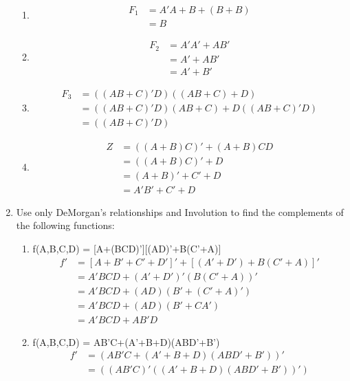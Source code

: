 \documentclass[12pt]{article}
\begin{document}
\begin{enumerate}
    \begin{enumerate}
        \item 
        \begin{align*}
         F_1&=A'A+B+(B+B)\\
         &=B
        \end{align*}
        \item
        \begin{align*}
            F_2 &= A'A'+AB'\\
            &= A'+AB'\\
            &= A'+B'
        \end{align*}
        \item
        \begin{align*}
            F_3 &= ((AB+C)'D)((AB+C)+D)\\
            &= ((AB+C)'D)(AB+C)+D((AB+C)'D)\\
            &= ((AB+C)'D)
        \end{align*}
        \item
        \begin{align*}
            Z &=((A+B)C)'+(A+B)CD\\
            &= ((A+B)C)' + D\\
            &= (A+B)'+C'+D\\
            &= A'B'+C'+D
        \end{align*}
    \end{enumerate}
    \addtocounter{enumi}{1}\item Use only DeMorgan's relationships and Involution to find the complements of the following functions:
    \begin{enumerate}
        \item f(A,B,C,D) = [A+(BCD)'][(AD)'+B(C'+A)]
        \begin{align*}
            f' &= [A+B'+C'+D']'+[(A'+D')+B(C'+A)]'\\
            &= A'BCD+(A'+D')'(B(C'+A))'\\
            &= A'BCD+(AD)(B'+(C'+A)')\\
            &= A'BCD+(AD)(B'+CA')\\
            &= A'BCD+AB'D
        \end{align*}
        \item f(A,B,C,D) = AB'C+(A'+B+D)(ABD'+B')
        \begin{align*}
            f' &=  (AB'C+(A'+B+D)(ABD'+B'))'\\
            &=  ((AB'C)'((A'+B+D)(ABD'+B'))')\\

\end{align*}
\end{enumerate}
\end{enumerate}
\end{document}
